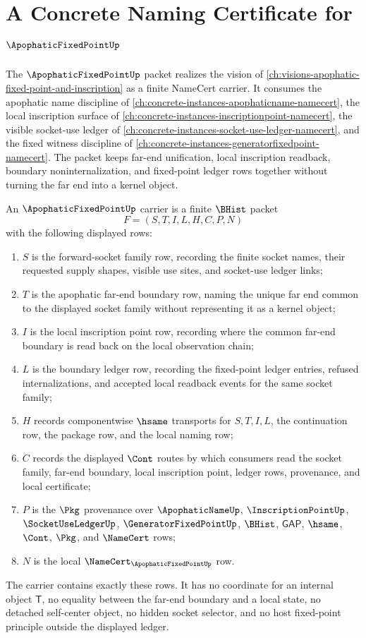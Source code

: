 \chapter{A Concrete Naming Certificate for $\ApophaticFixedPointUp$}
\label{ch:concrete-instances-apophaticfixedpoint-namecert}

The $\ApophaticFixedPointUp$ packet realizes the vision of \autoref{ch:visions-apophatic-fixed-point-and-inscription} as a finite NameCert carrier. It consumes the apophatic name discipline of \autoref{ch:concrete-instances-apophaticname-namecert}, the local inscription surface of \autoref{ch:concrete-instances-inscriptionpoint-namecert}, the visible socket-use ledger of \autoref{ch:concrete-instances-socket-use-ledger-namecert}, and the fixed witness discipline of \autoref{ch:concrete-instances-generatorfixedpoint-namecert}. The packet keeps far-end unification, local inscription readback, boundary noninternalization, and fixed-point ledger rows together without turning the far end into a kernel object.

\begin{definition}
\label{def:apophatic-fixed-point-carrier}
An $\ApophaticFixedPointUp$ carrier is a finite $\BHist$ packet
$$
F=(S,T,I,L,H,C,P,N)
$$
with the following displayed rows:
\begin{enumerate}
\item $S$ is the forward-socket family row, recording the finite socket names, their requested supply shapes, visible use sites, and socket-use ledger links;
\item $T$ is the apophatic far-end boundary row, naming the unique far end common to the displayed socket family without representing it as a kernel object;
\item $I$ is the local inscription point row, recording where the common far-end boundary is read back on the local observation chain;
\item $L$ is the boundary ledger row, recording the fixed-point ledger entries, refused internalizations, and accepted local readback events for the same socket family;
\item $H$ records componentwise $\hsame$ transports for $S,T,I,L$, the continuation row, the package row, and the local naming row;
\item $C$ records the displayed $\Cont$ routes by which consumers read the socket family, far-end boundary, local inscription point, ledger rows, provenance, and local certificate;
\item $P$ is the $\Pkg$ provenance over $\ApophaticNameUp$, $\InscriptionPointUp$, $\SocketUseLedgerUp$, $\GeneratorFixedPointUp$, $\BHist$, $\mathsf{GAP}$, $\hsame$, $\Cont$, $\Pkg$, and $\NameCert$ rows;
\item $N$ is the local $\NameCert_{\ApophaticFixedPointUp}$ row.
\end{enumerate}
The carrier contains exactly these rows. It has no coordinate for an internal object $\mathsf{T}$, no equality between the far-end boundary and a local state, no detached self-center object, no hidden socket selector, and no host fixed-point principle outside the displayed ledger.
\end{definition}


